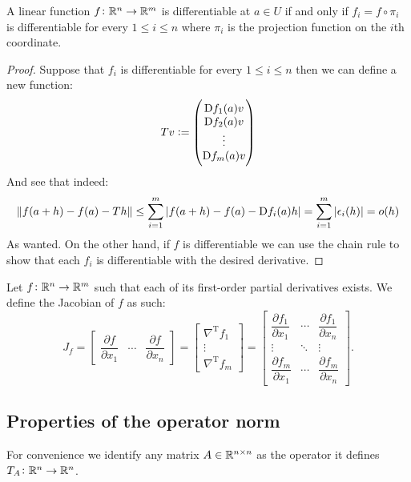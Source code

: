 \documentclass[11pt,a4paper]{article}
\begin{document}
\begin{proposition}
  A linear function $f \colon \mathbb{R}^n \to \mathbb{R}^m$ is differentiable at 
  $a \in U$ if and only if $f_i = f \circ \pi_i$ is differentiable 
  for every $1 \le i \le n$ where $\pi_i$ is the projection function 
  on the $i$th coordinate.
\end{proposition}
\begin{proof}
  Suppose that $f_i$ is differentiable for every $1 \le i \le n$ then
  we can define a new function:
  \[
    Tv := \begin{pmatrix} \mathrm{D} f_1(a)v \\ \mathrm{D} f_2(a)v \\ 
    \vdots \\ \mathrm{D} f_m(a)v \end{pmatrix}
  \]
  And see that indeed:
  \[
    \|f(a + h) - f(a) - Th\| \le 
    \sum_{i=1}^{m}|f(a + h) - f(a) - \mathrm{D} f_i(a)h| = 
    \sum_{i=1}^{m}|\epsilon_i(h)| = o(h)
  \]
  As wanted. On the other hand, if $f$ is differentiable we can use
  the chain rule to show that each $f_i$ is differentiable with the
  desired derivative.
\end{proof}
\begin{definition}[Jacobian]
  Let $f \colon \mathbb{R}^n \to \mathbb{R}^m$ such that each of its first-order partial 
  derivatives exists. We define the Jacobian of $f$ as such:
  \[
    {J_{f}} ={\begin{bmatrix}{\dfrac {\partial {f} }
    {\partial x_{1}}}&\cdots &{\dfrac {\partial {f} }{\partial 
    x_{n}}}\end{bmatrix}}={\begin{bmatrix}\nabla ^{\mathrm {T} }f_{1}\\
    \vdots \\\nabla ^{\mathrm {T} }f_{m}\end{bmatrix}}={\begin{bmatrix}
    {\dfrac {\partial f_{1}}{\partial x_{1}}}&\cdots &{\dfrac {\partial 
    f_{1}}{\partial x_{n}}}\\\vdots &\ddots &\vdots \\{\dfrac {\partial 
    f_{m}}{\partial x_{1}}}&\cdots &{\dfrac {\partial f_{m}}{\partial 
    x_{n}}}\end{bmatrix}}.
  \]
\end{definition}

\subsection{Properties of the operator norm}
\begin{remark}
  For convenience we identify any matrix $A \in \mathbb{R}^{n \times n}$ as the
  operator it defines $T_A \colon \mathbb{R}^n \to \mathbb{R}^n$.
\end{remark}
\end{document}
